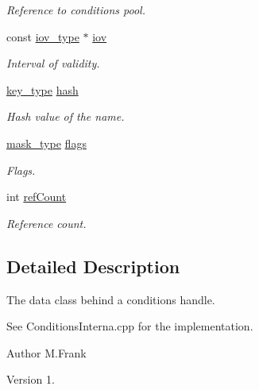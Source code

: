 \begin{DoxyCompactItemize}
\begin{DoxyCompactList}\small\item\em Reference to conditions pool. \end{DoxyCompactList}\item 
const \hyperlink{class_d_d4hep_1_1_conditions_1_1_interna_1_1_condition_object_a6d54716450a73a1a439ca06445f56d24}{iov\+\_\+type} $\ast$ \hyperlink{class_d_d4hep_1_1_conditions_1_1_interna_1_1_condition_object_af04a3341b8791fbcf60fe5e5fff20166}{iov}
\begin{DoxyCompactList}\small\item\em Interval of validity. \end{DoxyCompactList}\item 
\hyperlink{class_d_d4hep_1_1_conditions_1_1_interna_1_1_condition_object_a61a3251d047bd75dcdebb0e1c1409101}{key\+\_\+type} \hyperlink{class_d_d4hep_1_1_conditions_1_1_interna_1_1_condition_object_a6333e2a00c29743a1d64a26356714024}{hash}
\begin{DoxyCompactList}\small\item\em Hash value of the name. \end{DoxyCompactList}\item 
\hyperlink{class_d_d4hep_1_1_conditions_1_1_interna_1_1_condition_object_a1a9ff63fe2e060b973e6c2994b0a1370}{mask\+\_\+type} \hyperlink{class_d_d4hep_1_1_conditions_1_1_interna_1_1_condition_object_ad6e3e4fed5b13ddc85577d1fe5f3fcfd}{flags}
\begin{DoxyCompactList}\small\item\em Flags. \end{DoxyCompactList}\item 
int \hyperlink{class_d_d4hep_1_1_conditions_1_1_interna_1_1_condition_object_a0a8d0c67b38ca524010ed5d6ccdd1961}{ref\+Count}
\begin{DoxyCompactList}\small\item\em Reference count. \end{DoxyCompactList}\end{DoxyCompactItemize}


\subsection{Detailed Description}
The data class behind a conditions handle. 

See Conditions\+Interna.\+cpp for the implementation.

\begin{DoxyAuthor}{Author}
M.\+Frank 
\end{DoxyAuthor}
\begin{DoxyVersion}{Version}
1. 
\end{DoxyVersion}


